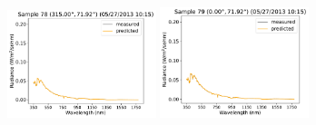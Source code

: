 \begin{center}
\includegraphics[width=0.325\textwidth]{img/05271015_s78.pdf}
\includegraphics[width=0.325\textwidth]{img/05271015_s79.pdf}
\end{center}

\mbox{}
\clearpage
